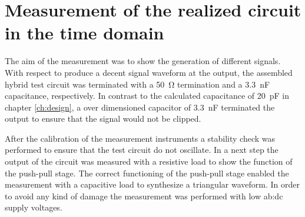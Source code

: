 \chapter{Measurement of the realized circuit in the time domain}
\label{ch:measurement}



The aim of the measurement was to show the generation of different signals.\\
With respect to produce a decent signal waveform at the output, the assembled hybrid test circuit was terminated with a \SI{50}{\ohm} termination and a \SI{3.3}{\nano\farad} capacitance, respectively.
In contrast to the calculated capacitance of \SI{20}{\pico \farad} in chapter \ref{ch:design}, a over dimensioned capacitor of \SI{3.3}{\nano\farad} terminated the output to ensure that the signal would not be clipped.

After the calibration of the measurement instruments a stability check was performed to ensure that the test circuit do not oscillate.
In a next step the output of the circuit was measured with a resistive load to show the function of the push-pull stage.
The correct functioning of the push-pull stage enabled the measurement with a capacitive load to synthesize a triangular waveform.
In order to avoid any kind of damage the measurement was performed with low \gls{ab:dc} supply voltages.


